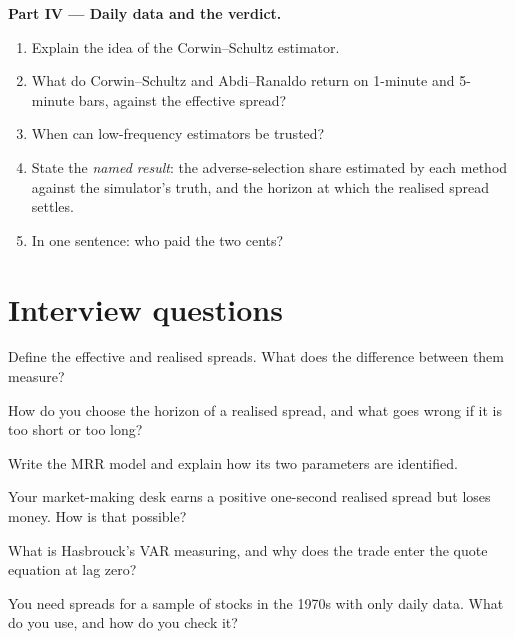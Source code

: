 \begin{problem}
\medskip\noindent\textbf{Part IV --- Daily data and the verdict.}
\begin{enumerate}[resume]
\item Explain the idea of the Corwin--Schultz estimator.
\item What do Corwin--Schultz and Abdi--Ranaldo return on 1-minute and 5-minute bars, against the effective spread?
\item When can low-frequency estimators be trusted?
\item State the \emph{named result}: the adverse-selection share estimated by each method against the simulator's truth, and the horizon at which the
realised spread settles.
\item In one sentence: who paid the two cents?
\end{enumerate}
\end{problem}

\section{Interview questions}

\begin{interviewq}\label{iq:mx:decomposing-the-spread:1}
Define the effective and realised spreads. What does the difference between them measure?
\end{interviewq}

\begin{interviewq}\label{iq:mx:decomposing-the-spread:2}
How do you choose the horizon of a realised spread, and what goes wrong if it is too short or too long?
\end{interviewq}

\begin{interviewq}\label{iq:mx:decomposing-the-spread:3}
Write the MRR model and explain how its two parameters are identified.
\end{interviewq}

\begin{interviewq}\label{iq:mx:decomposing-the-spread:4}
Your market-making desk earns a positive one-second realised spread but loses money. How is that possible?
\end{interviewq}

\begin{interviewq}\label{iq:mx:decomposing-the-spread:5}
What is Hasbrouck's VAR measuring, and why does the trade enter the quote equation at lag zero?
\end{interviewq}

\begin{interviewq}\label{iq:mx:decomposing-the-spread:6}
You need spreads for a sample of stocks in the 1970s with only daily data. What do you use, and how do you check it?
\end{interviewq}
